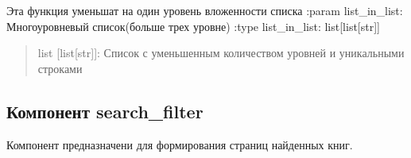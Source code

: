 \documentclass[letterpaper,10pt,russian]{sphinxmanual}
\begin{document}
\begin{fulllineitems}
\label{\detokenize{blueprints:blueprints.function.parser_list_in_list}}
\pysigstartsignatures
{}
\pysigstopsignatures
\sphinxAtStartPar
Эта функция уменьшат на один уровень вложенности списка
:param list\_in\_list: Многоуровневый список(больше трех уровне)
:type list\_in\_list: list{[}list{[}str{]}{]}
\begin{quote}\begin{description}
\sphinxAtStartPar
list {[}list{[}str{]}{]}: Список с уменьшенным количеством уровней и уникальными строками

\end{description}\end{quote}

\end{fulllineitems}



\subsection{Компонент search\_filter}
\label{\detokenize{blueprints:search-filter}}
\begin{DUlineblock}{0em}
\item[] Компонент предназначени для формирования страниц найденных книг.
\end{DUlineblock}
\label{\detokenize{blueprints:module-blueprints.search_filter}}
\end{document}
